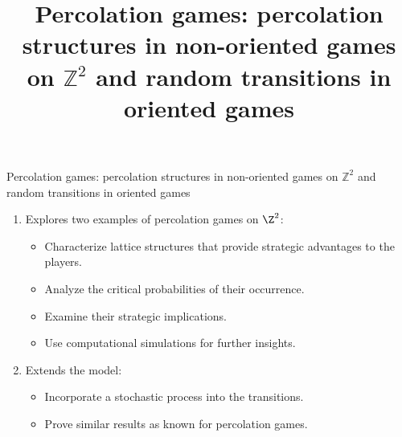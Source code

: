 \documentclass[11pt, mathserif]{beamer}
\title{%
      Percolation games: percolation structures in non-oriented games on \texorpdfstring{$\mathbb{Z}^2$}{Z2} and random transitions in oriented games}
\date{}
\begin{document}
    \begin{frame}
        \maketitle
    \end{frame}

    \justify %
    \begin{frame}
        \begin{center}
            \textcolor{blendedblue}{Percolation games: percolation structures in non-oriented games on \texorpdfstring{$\mathbb{Z}^2$}{Z2} and random transitions in oriented games}
        \end{center}
        \vspace{0.5cm}

        \begin{enumerate}
            \item Explores two examples of percolation games on $\Z^2$:
                \begin{itemize}
                    \item Characterize lattice structures that provide strategic advantages to the players.
                    \item Analyze the critical probabilities of their occurrence. 
                    \item Examine their strategic implications. 
                    \item Use computational simulations for further insights. 
                \end{itemize}
            \item Extends the model:
                \begin{itemize}
                    \item Incorporate a stochastic process into the transitions.
                    \item Prove similar results as known for percolation games. 
                \end{itemize}
        \end{enumerate}
    \end{frame}
\end{document}
